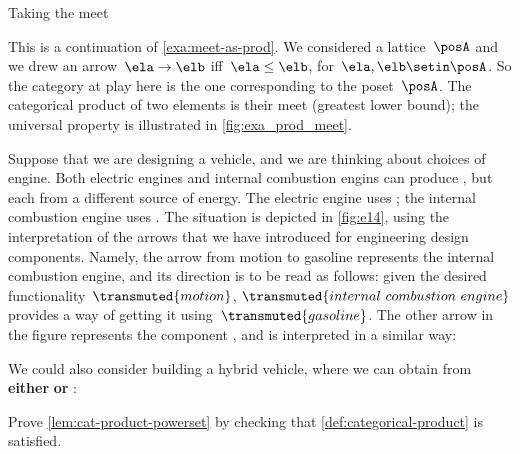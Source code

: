 \begin{marginfigure}
    \centering
    \caption{Taking the meet}
    \label{fig:exa_prod_meet_cont}
\end{marginfigure}

\begin{example}
    \label{exa:meet-as-prod-cont}
    This is a continuation of \cref{exa:meet-as-prod}.
    We considered a lattice~$\posA$ and we drew an arrow~$\ela \to \elb$ iff~$\ela \leq \elb$, for~$\ela,\elb\setin \posA$.
    So the category at play here is the one corresponding to the poset~$\posA$.
    The categorical product of two elements is their meet (greatest lower bound); the universal property is illustrated in \cref{fig:exa_prod_meet}.
\end{example}

\begin{example}
    Suppose that we are designing a vehicle, and we are thinking about choices of engine.
    Both electric engines and internal combustion engins can produce , but each from a different source of energy.
    The electric engine uses ; the internal combustion engine uses .
    The situation is depicted in \cref{fig:e14}, using the interpretation of the arrows that we have introduced for engineering design components.
    Namely, the arrow from motion to gasoline represents the internal combustion engine, and its direction is to be read as follows: given the desired functionality~$\transmuted{motion}$, $\transmuted{internal \ combustion \ engine}$ provides a way of getting it using~$\transmuted{gasoline}$.
    The other arrow in the figure represents the component , and is interpreted in a similar way:


    We could also consider building a hybrid vehicle, where we can obtain  from \textbf{either}  \textbf{or} :

\end{example}

\vfill
\begin{gradedexercise}
    \label{ex:CatProductPowerset}
    Prove \cref{lem:cat-product-powerset} by checking that \cref{def:categorical-product} is satisfied.
\end{gradedexercise}

